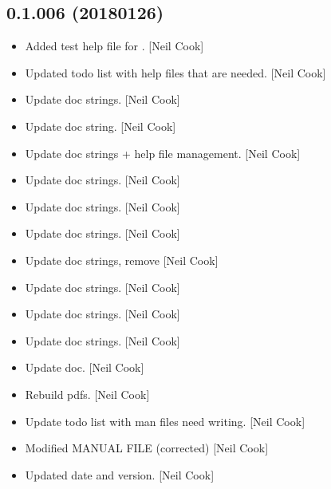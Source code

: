\documentclass[a4paper,10pt,english]{report}
\begin{document}
\subsection{0.1.006 (2018\sphinxhyphen{}01\sphinxhyphen{}26)}
\label{\detokenize{misc/changelog:id517}}\begin{itemize}
\item {} 
Added test help file \sphinxhyphen{} for . {[}Neil Cook{]}

\item {} 
Updated todo list with help files that are needed. {[}Neil Cook{]}

\item {} 
Update doc strings. {[}Neil Cook{]}

\item {} 
Update doc string. {[}Neil Cook{]}

\item {} 
Update doc strings + help file management. {[}Neil Cook{]}

\item {} 
Update doc strings. {[}Neil Cook{]}

\item {} 
Update doc strings. {[}Neil Cook{]}

\item {} 
Update doc strings. {[}Neil Cook{]}

\item {} 
Update doc strings, remove  {[}Neil Cook{]}

\item {} 
Update doc strings. {[}Neil Cook{]}

\item {} 
Update doc strings. {[}Neil Cook{]}

\item {} 
Update doc strings. {[}Neil Cook{]}

\item {} 
Update doc. {[}Neil Cook{]}

\item {} 
Rebuild pdfs. {[}Neil Cook{]}

\item {} 
Update todo list with man files need writing. {[}Neil Cook{]}

\item {} 
Modified MANUAL FILE (corrected) {[}Neil Cook{]}

\item {} 
Updated date and version. {[}Neil Cook{]}


\end{itemize}
\end{document}
